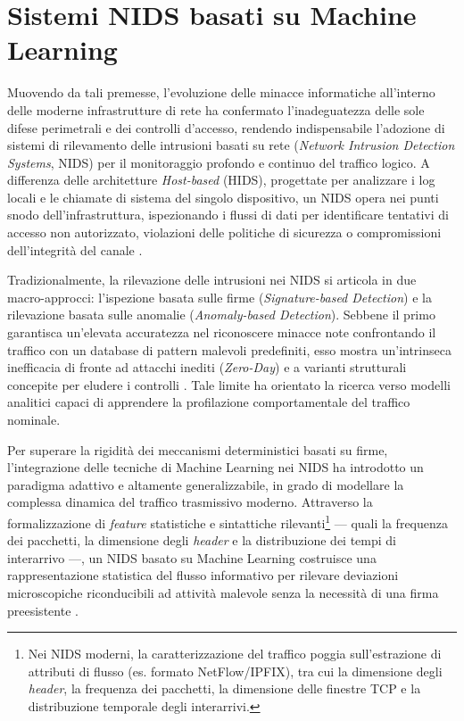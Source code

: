 \section{Sistemi NIDS basati su Machine Learning}
\label{sec:ids_ml}

Muovendo da tali premesse, l'evoluzione delle minacce informatiche all'interno delle moderne infrastrutture di rete ha confermato l'inadeguatezza delle sole difese perimetrali e dei controlli d'accesso, rendendo indispensabile l'adozione di sistemi di rilevamento delle intrusioni basati su rete (\textit{Network Intrusion Detection Systems}, NIDS) per il monitoraggio profondo e continuo del traffico logico.
A differenza delle architetture \textit{Host-based} (HIDS), progettate per analizzare i log locali e le chiamate di sistema del singolo dispositivo, un NIDS opera nei punti snodo dell'infrastruttura, ispezionando i flussi di dati per identificare tentativi di accesso non autorizzato, violazioni delle politiche di sicurezza o compromissioni dell'integrità del canale \cite{hindy2020}.

Tradizionalmente, la rilevazione delle intrusioni nei NIDS si articola in due macro-approcci: l'ispezione basata sulle firme (\textit{Signature-based Detection}) e la rilevazione basata sulle anomalie (\textit{Anomaly-based Detection}).
Sebbene il primo garantisca un'elevata accuratezza nel riconoscere minacce note confrontando il traffico con un database di pattern malevoli predefiniti, esso mostra un'intrinseca inefficacia di fronte ad attacchi inediti (\textit{Zero-Day}) e a varianti strutturali concepite per eludere i controlli \cite{khraisat2019}.
Tale limite ha orientato la ricerca verso modelli analitici capaci di apprendere la profilazione comportamentale del traffico nominale. 

Per superare la rigidità dei meccanismi deterministici basati su firme, l'integrazione delle tecniche di Machine Learning nei NIDS ha introdotto un paradigma adattivo e altamente generalizzabile, in grado di modellare la complessa dinamica del traffico trasmissivo moderno.
Attraverso la formalizzazione di \textit{feature} statistiche e sintattiche rilevanti\footnote{Nei NIDS moderni, la caratterizzazione del traffico poggia sull'estrazione di attributi di flusso (es. formato NetFlow/IPFIX), tra cui la dimensione degli \textit{header}, la frequenza dei pacchetti, la dimensione delle finestre TCP e la distribuzione temporale degli interarrivi.} — quali la frequenza dei pacchetti, la dimensione degli \textit{header} e la distribuzione dei tempi di interarrivo —, un NIDS basato su Machine Learning costruisce una rappresentazione statistica del flusso informativo per rilevare deviazioni microscopiche riconducibili ad attività malevole senza la necessità di una firma preesistente \cite{hindy2020, khraisat2019}.

